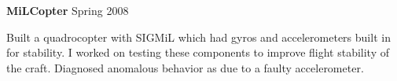 \textbf{MiLCopter} \hfill Spring 2008
\begin{description}
\item Built a quadrocopter with SIGMiL which had gyros
and accelerometers built in for stability. I worked on
testing these components to improve flight stability of the craft.
Diagnosed anomalous behavior as due to a faulty accelerometer.
\end{description}
